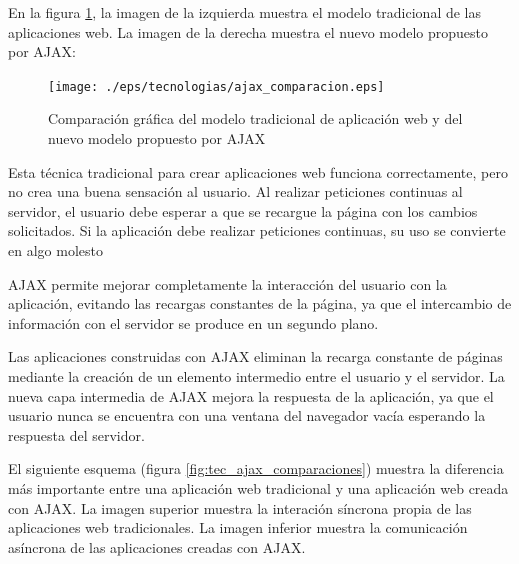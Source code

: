    En la figura \ref{fig:tec_ajax_trad_vs_nuevo}, la imagen de la izquierda muestra el modelo tradicional de las aplicaciones web. La imagen de la derecha muestra el nuevo modelo propuesto por AJAX:
   
   \begin{figure}[H]
     \centering
       \texttt{[image: ./eps/tecnologias/ajax\_comparacion.eps]}
     \caption{Comparación gráfica del modelo tradicional de aplicación web y del nuevo modelo propuesto por AJAX}
     \label{fig:tec_ajax_trad_vs_nuevo}
   \end{figure}   
   
   Esta técnica tradicional para crear aplicaciones web funciona correctamente, pero no crea una buena sensación al usuario. Al realizar peticiones continuas al servidor, el usuario debe esperar a que se recargue la página con los cambios solicitados. Si la aplicación debe realizar peticiones continuas, su uso se convierte en algo molesto

   AJAX permite mejorar completamente la interacción del usuario con la aplicación, evitando las recargas constantes de la página, ya que el intercambio de información con el servidor se produce en un segundo plano.

   Las aplicaciones construidas con AJAX eliminan la recarga constante de páginas mediante la creación de un elemento intermedio entre el usuario y el servidor. La nueva capa intermedia de AJAX mejora la respuesta de la aplicación, ya que el usuario nunca se encuentra con una ventana del navegador vacía esperando la respuesta del servidor.

   El siguiente esquema (figura \ref{fig:tec_ajax_comparaciones}) muestra la diferencia más importante entre una aplicación web tradicional y una aplicación web creada con AJAX. La imagen superior muestra la interación síncrona propia de las aplicaciones web tradicionales. La imagen inferior muestra la comunicación asíncrona de las aplicaciones creadas con AJAX.
   
